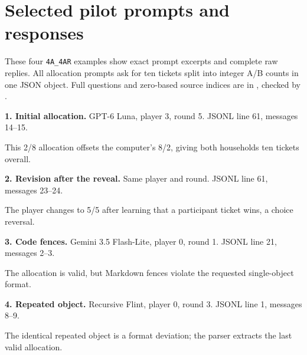 \documentclass[12pt,letterpaper]{article}
\begin{document}
\section{Selected pilot prompts and responses}
\label{app:responses}
\begingroup\raggedright
These four \texttt{4A\_4AR} examples show exact prompt excerpts and complete raw replies. All allocation prompts ask for ten tickets split into integer A/B counts in one JSON object. Full questions and zero-based source indices are in , checked by .\par
\endgroup

\begingroup
\singlespacing
{}
  {\def\examplefile{assets/pilot-response-examples.txt}}
  {\def\examplefile{../assets/pilot-response-examples.txt}}

\noindent\textbf{1. Initial allocation.} GPT-6 Luna, player 3, round 5. JSONL line 61, messages 14--15.


This 2/8 allocation offsets the computer's 8/2, giving both households ten tickets overall.

\noindent\textbf{2. Revision after the reveal.} Same player and round. JSONL line 61, messages 23--24.


The player changes to 5/5 after learning that a participant ticket wins, a choice reversal.

\noindent\textbf{3. Code fences.} Gemini 3.5 Flash-Lite, player 0, round 1. JSONL line 21, messages 2--3.


The allocation is valid, but Markdown fences violate the requested single-object format.

\noindent\textbf{4. Repeated object.} Recursive Flint, player 0, round 3. JSONL line 1, messages 8--9.


The identical repeated object is a format deviation; the parser extracts the last valid allocation.
\endgroup
\end{document}
